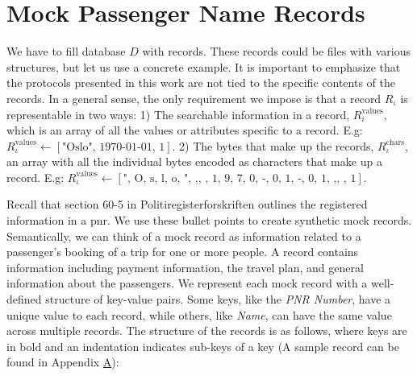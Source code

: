 \section{Mock Passenger Name Records} \label{sec:MockPassengerNumberRecords}

We have to fill database $ D $ with records. These records could be files with various structures, but let us use a concrete example. It is important to emphasize that the protocols presented in this work are not tied to the specific contents of the records. In a general sense, the only requirement we impose is that a record $ R_{\iota} $ is representable in two ways: 1) The searchable information in a record, $ R^{\mathrm{\mathrm{values}}}_i $, which is an array of all the values or attributes specific to a record. E.g: $ R^{\mathrm{values}}_{\iota} \gets \left[ \text{"Oslo", 1970-01-01, 1} \right]$. 2) The bytes that make up the records, $ R^{\mathrm{chars}}_{\iota} $, an array with all the individual bytes encoded as characters that make up a record. E.g:  $ R^{\mathrm{values}}_{\iota} \gets \left[ \text{", O, s, l, o, ", ,, , 1, 9, 7, 0, -, 0, 1, -, 0, 1, ,, , 1} \right]$.

Recall that section 60-5 in Politiregisterforskriften outlines the registered information in a \acrshort{pnr}. We use these bullet points to create synthetic mock records. Semantically, we can think of a mock record as information related to a passenger's booking of a trip for one or more people. A record contains information including payment information, the travel plan, and general information about the passengers. We represent each mock record with a well-defined structure of key-value pairs. Some keys, like the \textit{PNR Number}, have a unique value to each record, while others, like \textit{Name}, can have the same value across multiple records. The structure of the records is as follows, where keys are in bold and an indentation indicates sub-keys of a key (A sample record can be found in Appendix \hyperref[apx:mockrecord]{A}): 

